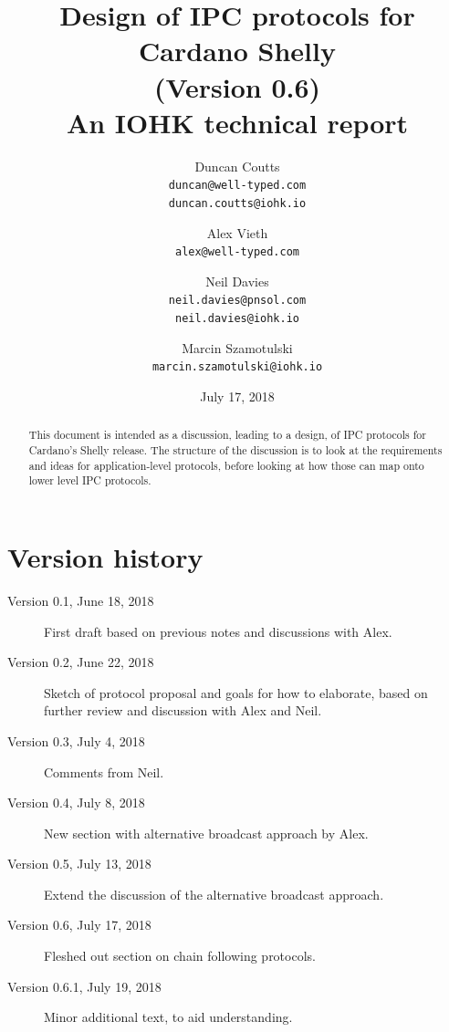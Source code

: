 \documentclass{article}
\theoremstyle{definition}{
  \newtheorem{lemma}{Lemma}[section] %
  \newtheorem{definition}[lemma]{Definition}
}
\theoremstyle{theorem}{
  \newtheorem{invariant}[lemma]{Invariant}
  \newtheorem{proofobligation}[lemma]{Proof Obligation}
}
\numberwithin{equation}{lemma}
\begin{document}
\title{Design of IPC protocols for Cardano Shelly \\
       {\small (Version 0.6)} \\
       {\large \sc An IOHK technical report}}
\author{Duncan Coutts \\ {\small \texttt{duncan@well-typed.com}} \\
                         {\small \texttt{duncan.coutts@iohk.io}}
   \and Alex Vieth \\ {\small \texttt{alex@well-typed.com}}
   \and Neil Davies \\ {\small \texttt{neil.davies@pnsol.com}} \\
                       {\small \texttt{neil.davies@iohk.io}}
   \and Marcin Szamotulski \\ {\small \texttt{marcin.szamotulski@iohk.io}}
   }
\date{July 17, 2018}

\maketitle

\begin{abstract}
This document is intended as a discussion, leading to a design, of IPC
protocols for Cardano's Shelly release. The structure of the discussion is to
look at the requirements and ideas for application-level protocols, before
looking at how those can map onto lower level IPC protocols.
\end{abstract}

\tableofcontents

\section*{Version history}

\begin{description}
\item[Version 0.1, June 18, 2018] First draft based on previous notes and
                                  discussions with Alex.
\item[Version 0.2, June 22, 2018] Sketch of protocol proposal and goals for
                                  how to elaborate, based on further review
                                  and discussion with Alex and Neil.
\item[Version 0.3, July 4, 2018]  Comments from Neil.
\item[Version 0.4, July 8, 2018]  New section with alternative broadcast approach by Alex.
\item[Version 0.5, July 13, 2018] Extend the discussion of the alternative broadcast approach.
\item[Version 0.6, July 17, 2018] Fleshed out section on chain following protocols.
\item[Version 0.6.1, July 19, 2018] Minor additional text, to aid understanding.
\end{description}
\end{document}
